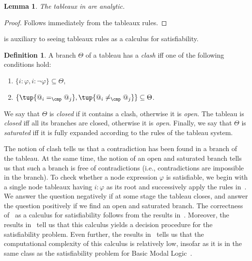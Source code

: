 \documentclass[10pt,a4paper]{amsart}
\newtheorem{lem}[thm]{Lemma}
\theoremstyle{definition}
\newtheorem{defi}[thm]{Definition}
\theoremstyle{remark}
\begin{document}
\begin{lem} \label{prop:analytic}
    The tableaux in  are analytic.
\end{lem}
\begin{proof}
    Follows immediately from the tableaux rules.
\end{proof}

 is auxiliary to seeing tableaux rules as a calculus for satisfiability. 

\begin{defi} \label{def:clash}\label{def:saturated}\label{def:consistency}
    A branch $\Theta$ of a tableau has a \emph{clash} iff one of the following conditions hold:
        \begin{enumerate}
            \item $\{i{:}\varphi,  i{:}\neg \varphi\}\subseteq\Theta$,
            \item $\{\tup{@_i =_\cmp @_j},\tup{@_i \neq_\cmp @_j}\}\subseteq\Theta$.
    \end{enumerate}
    We say that $\Theta$ is \emph{closed} if it contains a clash, otherwise it is \emph{open}.
    The tableau is \emph{closed} iff all its branches are closed, otherwise it is \emph{open}. 
    Finally, we say that $\Theta$ is \emph{saturated} iff it is fully expanded according to the rules of the tableau system.
\end{defi}

The notion of clash tells us that a contradiction has been found in a branch of the tableau.
At the same time, the notion of an open and saturated branch tells us that such a branch is free of contradictions (i.e., contradictions are impossible in the branch).  
To check whether  a node expression $\varphi$ is satisfiable, 
we begin with a single node tableaux having $i{:}\varphi$ as its root and successively apply the rules in~.
We answer the question negatively if at some stage the tableau closes, and answer the question positively if we find an open and saturated branch. 
The correctness of~ as a calculus for satisfiability follows from the results in~.
Moreover, the results in~ tell us that this calculus yields a decision procedure for the satisfiability problem.
Even further, the results in~ tells us that the computational complexity of this calculus is relatively low, insofar as it is in the same class as the satisfiability problem for Basic Modal Logic~\cite{handbook06}.
\end{document}
